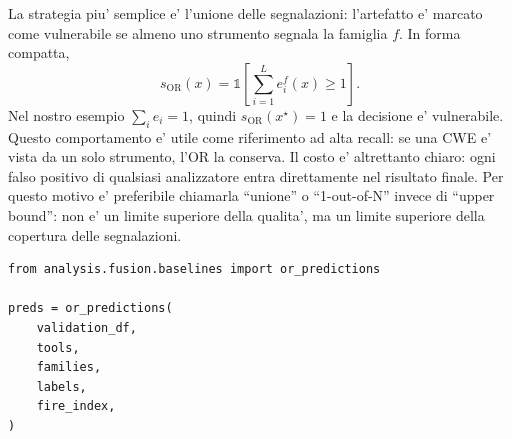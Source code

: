 La strategia piu' semplice e' l'unione delle segnalazioni: l'artefatto e' marcato come vulnerabile se almeno uno strumento segnala la famiglia $f$. In forma compatta,
\begin{equation}
s_{\mathrm{OR}}(x)=
\mathbb{1}\left[\sum_{i=1}^{L} e_i^f(x) \geq 1\right].
\end{equation}
Nel nostro esempio $\sum_i e_i=1$, quindi $s_{\mathrm{OR}}(x^\star)=1$ e la decisione e' vulnerabile. Questo comportamento e' utile come riferimento ad alta recall: se una CWE e' vista da un solo strumento, l'OR la conserva. Il costo e' altrettanto chiaro: ogni falso positivo di qualsiasi analizzatore entra direttamente nel risultato finale. Per questo motivo e' preferibile chiamarla ``unione'' o ``1-out-of-N'' invece di ``upper bound'': non e' un limite superiore della qualita', ma un limite superiore della copertura delle segnalazioni.

\begin{lstlisting}[caption={Implementazione OR in analysis/fusion/baselines.py}]
from analysis.fusion.baselines import or_predictions

preds = or_predictions(
    validation_df,
    tools,
    families,
    labels,
    fire_index,
)
\end{lstlisting}

